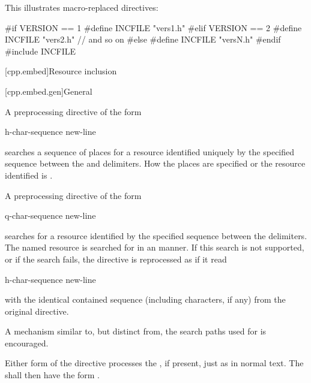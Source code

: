 \pnum
\begin{example}
This illustrates macro-replaced
directives:

\begin{codeblock}
#if VERSION == 1
    #define INCFILE  "vers1.h"
#elif VERSION == 2
    #define INCFILE  "vers2.h"  // and so on
#else
    #define INCFILE  "versN.h"
#endif
#include INCFILE
\end{codeblock}
\end{example}

[cpp.embed]{Resource inclusion}
%


[cpp.embed.gen]{General}

\pnum
A preprocessing directive of the form
\begin{ncsimplebnf}
 h-char-sequence \terminal{>}  new-line
\end{ncsimplebnf}
searches a sequence of
places for a resource identified uniquely by the specified sequence between
the \tcode{<} and \tcode{>} delimiters.
How the places are specified or the resource identified is
.

\pnum
A preprocessing directive of the form
\begin{ncsimplebnf}
 q-char-sequence   new-line
\end{ncsimplebnf}
searches for a resource identified by the specified sequence between the
 delimiters.
The named resource is searched for in an
manner.
If this search is not supported, or if the search fails, the directive is
reprocessed as if it read
\begin{ncsimplebnf}
 h-char-sequence \terminal{>}  new-line
\end{ncsimplebnf}
with the identical contained sequence (including \tcode{>} characters, if any)
from the original directive.

\pnum
\recommended A mechanism similar to, but distinct from, the
search paths used for  
is encouraged.

\pnum
Either form of the  directive processes the
, if present, just as in normal text.
The  shall then have the form
.

